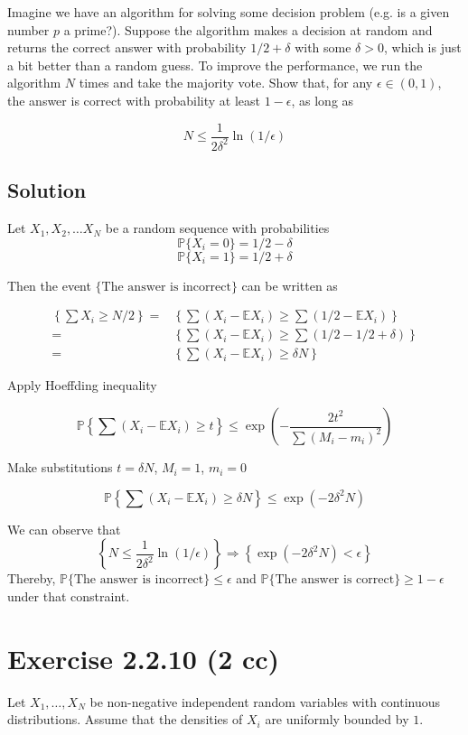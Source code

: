 \documentclass{article}
\begin{document}
Imagine we have an algorithm for solving some decision problem (e.g. is a given number $p$ a prime?). Suppose the algorithm makes a decision at random and returns the correct answer with probability $1/2 + \delta$ with some $\delta > 0$, which is just a bit better than a random guess. To improve the performance, we run the algorithm $N$ times and take the majority vote. Show that, for any $\epsilon \in (0, 1)$, the answer is correct with probability at least $1 - \epsilon$, as long as

$$N \leq \frac{1}{2\delta^2}\ln(1/\epsilon)$$

\subsection{Solution}

Let $X_1, X_2, \dots X_N$ be a random sequence with probabilities $$\mathbb P \{X_i = 0\} = 1/2 - \delta$$ $$\mathbb P \{X_i = 1\} = 1/2 + \delta$$

Then the event $\{\text{The answer is incorrect}\}$ can be written as 

\begin{equation*}
    \begin{aligned}
    \left\{ \sum X_i \geq N/2 \right\} = & \left\{ \sum (X_i - \mathbb E X_i) \geq \sum (1/2 - \mathbb E X_i) \right\} \\
    = & \left\{ \sum (X_i - \mathbb E X_i) \geq \sum (1/2 - 1/2 + \delta) \right\} \\
    = & \left\{ \sum (X_i - \mathbb E X_i) \geq \delta N \right\}
    \end{aligned}
\end{equation*}

Apply Hoeffding inequality

$$\mathbb P \left\{ \sum ( X_i -  \mathbb E X_i) \geq t \right\} \leq \exp\left(-\frac{2t^2}{\sum (M_i - m_i)^2}\right)$$

Make substitutions $t = \delta N$, $M_i = 1$, $m_i = 0$

$$\mathbb P \left\{ \sum (X_i - \mathbb E X_i) \geq \delta N \right\} \leq \exp(-2\delta^2 N)$$

We can observe that 
$$\left\{N \leq \frac{1}{2\delta^2}\ln(1/\epsilon)\right\} \Rightarrow \left\{\exp(-2\delta^2 N) < \epsilon\right\}$$
Thereby, $\mathbb P \{\text{The answer is incorrect}\} \leq \epsilon$ and $\mathbb P \{\text{The answer is correct}\} \geq 1 - \epsilon$ under that constraint.

\section{Exercise 2.2.10 (2 cc)}
Let $X_1, \dots , X_N$ be non-negative independent random variables with continuous distributions. Assume that the densities of $X_i$ are uniformly bounded by $1$.
\end{document}
